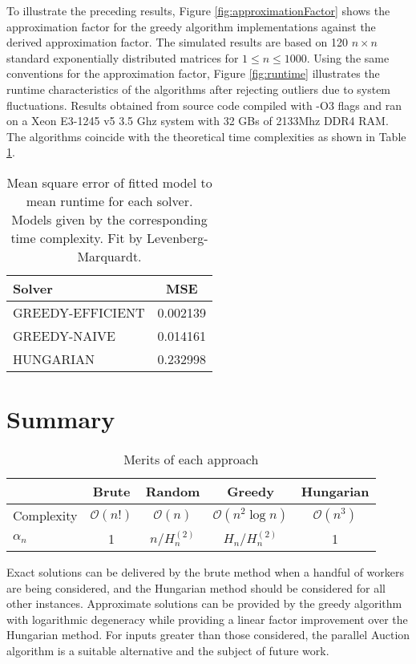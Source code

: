 \documentclass{article}
\newcommand{\boundedBy}[1]{\mathcal{O} \left ( #1 \right )}
\begin{document}
To illustrate the preceding results, Figure \ref{fig:approximationFactor} shows the approximation factor for the greedy algorithm implementations against the derived approximation factor. The simulated results are based on 120 $n \times n$ standard exponentially distributed matrices for $1 \le n \le 1000$. Using the same conventions for the approximation factor, Figure \ref{fig:runtime} illustrates the runtime characteristics of the algorithms after rejecting outliers due to system fluctuations. Results obtained from source code compiled with -O3 flags and ran on a Xeon E3-1245 v5 3.5 Ghz system with 32 GBs of 2133Mhz DDR4 RAM. The algorithms coincide with the theoretical time complexities as shown in Table \ref{tbl:runtime:mse}.

\begin{table}[H]
	\centering
	\begin{tabular}{l|c}
		Solver & MSE \\
		\hline
		GREEDY-EFFICIENT & 0.002139 \\
		GREEDY-NAIVE & 0.014161 \\
		HUNGARIAN & 0.232998
	\end{tabular}
	\caption{Mean square error of fitted model to mean runtime for each solver. Models given by the corresponding time complexity. Fit by Levenberg-Marquardt.}
	\label{tbl:runtime:mse}
\end{table}

\section{Summary}

\begin{table}[H]
	\centering
	\begin{tabular}{l|c|c|c|c}
		& Brute & Random & Greedy & Hungarian \\
		\hline
		Complexity & $\boundedBy{n!}$ & $\boundedBy{n}$ & $\boundedBy{n^2 \log n}$ & $\boundedBy{n^3}$ \\
		$\alpha_n$ & 1 & $n / H_n^{(2)}$ & $H_n / H_n^{(2)}$ & 1
	\end{tabular}
	\caption{Merits of each approach}
\end{table}

Exact solutions can be delivered by the brute method when a handful of workers are being considered, and the Hungarian method should be considered for all other instances. Approximate solutions can be provided by the greedy algorithm with logarithmic degeneracy while providing a linear factor improvement over the Hungarian method. For inputs greater than those considered, the parallel Auction algorithm \cite{bertsekas1988auction} is a suitable alternative and the subject of future work.



\end{document}

